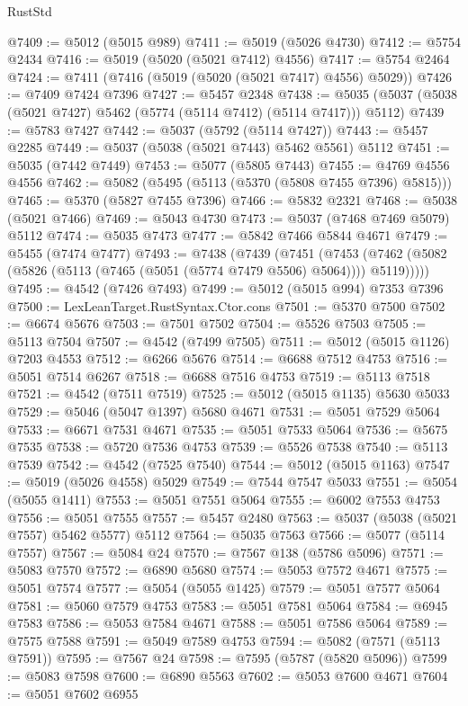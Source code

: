 \begin{lexlean}{RustStd}
\begin{coremodule}
@7409 := @5012 (@5015 @989)
@7411 := @5019 (@5026 @4730)
@7412 := @5754 @2434
@7416 := @5019 (@5020 (@5021 @7412) @4556)
@7417 := @5754 @2464
@7424 := @7411 (@7416 (@5019 (@5020 (@5021 @7417) @4556) @5029))
@7426 := @7409 @7424 @7396
@7427 := @5457 @2348
@7438 := @5035 (@5037 (@5038 (@5021 @7427) @5462 (@5774 (@5114 @7412) (@5114 @7417))) @5112)
@7439 := @5783 @7427
@7442 := @5037 (@5792 (@5114 @7427))
@7443 := @5457 @2285
@7449 := @5037 (@5038 (@5021 @7443) @5462 @5561) @5112
@7451 := @5035 (@7442 @7449)
@7453 := @5077 (@5805 @7443)
@7455 := @4769 @4556 @4556
@7462 := @5082 (@5495 (@5113 (@5370 (@5808 @7455 @7396) @5815)))
@7465 := @5370 (@5827 @7455 @7396)
@7466 := @5832 @2321
@7468 := @5038 (@5021 @7466)
@7469 := @5043 @4730
@7473 := @5037 (@7468 @7469 @5079) @5112
@7474 := @5035 @7473
@7477 := @5842 @7466 @5844 @4671
@7479 := @5455 (@7474 @7477)
@7493 := @7438
    (@7439
      (@7451
        (@7453 (@7462 (@5082 (@5826 (@5113 (@7465 (@5051 (@5774 @7479 @5506) @5064)))) @5119)))))
@7495 := @4542 (@7426 @7493)
@7499 := @5012 (@5015 @994) @7353 @7396
@7500 := LexLeanTarget.RustSyntax.Ctor.cons
@7501 := @5370 @7500
@7502 := @6674 @5676
@7503 := @7501 @7502
@7504 := @5526 @7503
@7505 := @5113 @7504
@7507 := @4542 (@7499 @7505)
@7511 := @5012 (@5015 @1126) @7203 @4553
@7512 := @6266 @5676
@7514 := @6688 @7512 @4753
@7516 := @5051 @7514 @6267
@7518 := @6688 @7516 @4753
@7519 := @5113 @7518
@7521 := @4542 (@7511 @7519)
@7525 := @5012 (@5015 @1135) @5630 @5033
@7529 := @5046 (@5047 @1397) @5680 @4671
@7531 := @5051 @7529 @5064
@7533 := @6671 @7531 @4671
@7535 := @5051 @7533 @5064
@7536 := @5675 @7535
@7538 := @5720 @7536 @4753
@7539 := @5526 @7538
@7540 := @5113 @7539
@7542 := @4542 (@7525 @7540)
@7544 := @5012 (@5015 @1163)
@7547 := @5019 (@5026 @4558) @5029
@7549 := @7544 @7547 @5033
@7551 := @5054 (@5055 @1411)
@7553 := @5051 @7551 @5064
@7555 := @6002 @7553 @4753
@7556 := @5051 @7555
@7557 := @5457 @2480
@7563 := @5037 (@5038 (@5021 @7557) @5462 @5577) @5112
@7564 := @5035 @7563
@7566 := @5077 (@5114 @7557)
@7567 := @5084 @24
@7570 := @7567 @138 (@5786 @5096)
@7571 := @5083 @7570
@7572 := @6890 @5680
@7574 := @5053 @7572 @4671
@7575 := @5051 @7574
@7577 := @5054 (@5055 @1425)
@7579 := @5051 @7577 @5064
@7581 := @5060 @7579 @4753
@7583 := @5051 @7581 @5064
@7584 := @6945 @7583
@7586 := @5053 @7584 @4671
@7588 := @5051 @7586 @5064
@7589 := @7575 @7588
@7591 := @5049 @7589 @4753
@7594 := @5082 (@7571 (@5113 @7591))
@7595 := @7567 @24
@7598 := @7595 (@5787 (@5820 @5096))
@7599 := @5083 @7598
@7600 := @6890 @5563
@7602 := @5053 @7600 @4671
@7604 := @5051 @7602 @6955

\end{coremodule}
\end{lexlean}
